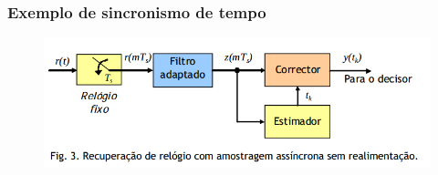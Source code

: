 \begin{frame}[t]
	\frametitle{Exemplo de sincronismo de tempo}
	\begin{figure}
        \includegraphics[scale=.4]{figs/time_synch2.png}
    \end{figure}
\end{frame}